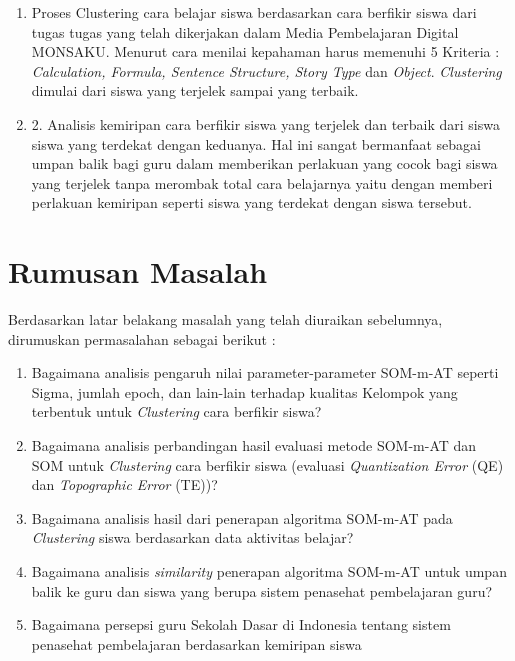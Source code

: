 \begin{enumerate}
	\item Proses Clustering cara belajar siswa berdasarkan cara berfikir siswa dari tugas tugas yang telah dikerjakan dalam Media Pembelajaran Digital MONSAKU. Menurut \cite{SupiantoHayashiHirashima2017} cara menilai kepahaman harus memenuhi 5 Kriteria : \textit{Calculation, Formula, Sentence Structure, Story Type} dan \textit{Object}. \textit{Clustering} dimulai dari siswa yang terjelek sampai yang terbaik.
	
	\item 2.	Analisis kemiripan cara berfikir siswa yang terjelek dan terbaik dari siswa siswa yang terdekat dengan keduanya. Hal ini sangat bermanfaat sebagai umpan balik bagi guru dalam memberikan perlakuan yang cocok bagi siswa yang terjelek tanpa merombak total cara belajarnya yaitu dengan memberi perlakuan kemiripan seperti siswa yang terdekat dengan siswa tersebut.
\end{enumerate}

\section{Rumusan Masalah}
Berdasarkan latar belakang masalah yang telah diuraikan sebelumnya, dirumuskan permasalahan sebagai berikut :
\begin{enumerate}
	\item Bagaimana analisis pengaruh nilai parameter-parameter SOM-m-AT seperti Sigma, jumlah epoch, dan lain-lain terhadap kualitas Kelompok yang terbentuk untuk \textit{Clustering} cara berfikir siswa?
	
	\item Bagaimana analisis perbandingan hasil evaluasi metode SOM-m-AT dan SOM untuk \textit{Clustering} cara berfikir siswa (evaluasi \textit{Quantization Error} (QE) dan \textit{Topographic Error} (TE))?
	
	\item Bagaimana analisis hasil dari penerapan algoritma SOM-m-AT pada \textit{Clustering} siswa berdasarkan data aktivitas belajar?
	
	\item Bagaimana analisis \textit{similarity} penerapan algoritma SOM-m-AT untuk umpan balik ke guru dan siswa yang berupa sistem penasehat pembelajaran guru?
	
	\item Bagaimana persepsi guru Sekolah Dasar di Indonesia tentang sistem penasehat pembelajaran berdasarkan kemiripan siswa
\end{enumerate}


